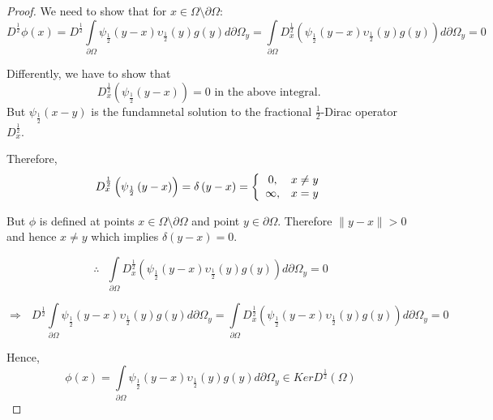 \documentclass{amsart}%
\theoremstyle{plain}
\numberwithin{equation}{section}
\begin{document}
\begin{proof}
We need to show that for $x\in\Omega\setminus\partial\Omega:$
\[
D^{\frac{1}{2}}\phi\left(  x\right)  =D^{\frac{1}{2}}%
{\displaystyle\int\limits_{\partial\Omega}}
\psi_{\frac{1}{2}}\left(  y-x\right)  \upsilon_{\frac{1}{2}}\left(  y\right)
g(y)d\partial\Omega_{y}=%
{\displaystyle\int\limits_{\partial\Omega}}
D_{x}^{\frac{1}{2}}\left(  \psi_{\frac{1}{2}}\left(  y-x\right)
\upsilon_{\frac{1}{2}}\left(  y\right)  g(y)\right)  d\partial\Omega_{y}=0
\]


Differently, we have to show that%
\[
D_{x}^{\frac{1}{2}}\left(  \psi_{\frac{1}{2}}\left(  y-x\right)  \right)
=0\text{ \ in the above integral. }%
\]
But $\psi_{\frac{1}{2}}\left(  x-y\right)  $ is the fundamnetal solution to
the fractional $\frac{1}{2}$-Dirac operator $D_{x}^{\frac{1}{2}}$.

Therefore,
\[
D_{x}^{\frac{1}{2}}\left(  \psi_{\frac{1}{2}}\left(  y-x\right)  \right)
=\delta\left(  y-x\right)  =\left\{
\begin{array}
[c]{cc}%
0, & x\neq y\\
\infty, & x=y
\end{array}
\right.
\]


But $\phi$ is defined at points $x\in\Omega\setminus\partial\Omega$ and point
$y\in\partial\Omega$. Therefore $\parallel y-x\parallel>0$ and hence $x\neq y$
which implies $\delta\left(  y-x\right)  =0$.%

\[
\therefore\text{ \ \ \ \ \ \ \ \ \ \ \ }%
{\displaystyle\int\limits_{\partial\Omega}}
D_{x}^{\frac{1}{2}}\left(  \psi_{\frac{1}{2}}\left(  y-x\right)
\upsilon_{\frac{1}{2}}\left(  y\right)  g(y)\right)  d\partial\Omega_{y}=0
\]
%

\[
\Longrightarrow\text{ \ \ \ \ \ \ \ \ }D^{\frac{1}{2}}%
{\displaystyle\int\limits_{\partial\Omega}}
\psi_{\frac{1}{2}}\left(  y-x\right)  \upsilon_{\frac{1}{2}}\left(  y\right)
g(y)d\partial\Omega_{y}=%
{\displaystyle\int\limits_{\partial\Omega}}
D_{x}^{\frac{1}{2}}\left(  \psi_{\frac{1}{2}}\left(  y-x\right)
\upsilon_{\frac{1}{2}}\left(  y\right)  g(y)\right)  d\partial\Omega_{y}=0
\]


Hence,%
\[
\phi\left(  x\right)  =%
{\displaystyle\int\limits_{\partial\Omega}}
\psi_{\frac{1}{2}}\left(  y-x\right)  \upsilon_{\frac{1}{2}}\left(  y\right)
g(y)d\partial\Omega_{y}\in KerD^{\frac{1}{2}}\left(  \Omega\right)
\]

\end{proof}
\end{document}
